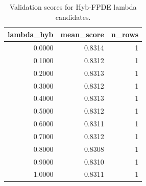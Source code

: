 \begin{table}[t]
\caption{Validation scores for Hyb-FPDE lambda candidates.}
\label{tab:lambda_distribution_computed}
\centering
\begin{tabular}{rrr}
\toprule
lambda\_hyb & mean\_score & n\_rows \\
\midrule
0.0000 & 0.8314 & 1 \\
0.1000 & 0.8312 & 1 \\
0.2000 & 0.8313 & 1 \\
0.3000 & 0.8312 & 1 \\
0.4000 & 0.8313 & 1 \\
0.5000 & 0.8312 & 1 \\
0.6000 & 0.8311 & 1 \\
0.7000 & 0.8312 & 1 \\
0.8000 & 0.8308 & 1 \\
0.9000 & 0.8310 & 1 \\
1.0000 & 0.8311 & 1 \\
\bottomrule
\end{tabular}

\end{table}
